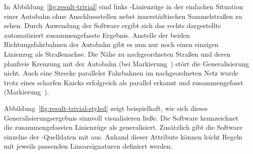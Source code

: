 \documentclass[../main/thesis.tex]{subfiles}
\begin{document}
In Abbildung~\ref{fig:result-trivial} sind links \osm-Linienzüge in der einfachen Situation einer Autobahn ohne Anschlussstellen nebst innerstädtischen Sammelstraßen zu sehen.
Durch Anwendung der Software ergibt sich das rechts dargestellte automatisiert zusammengefasste Ergebnis.
Anstelle der beiden Richtungsfahrbahnen der Autobahn gibt es nun nur noch einen einzigen Linienzug als Straßenachse.
Die Nähe zu nachgeordneten Straßen und deren planfreie Kreuzung mit der Autobahn (bei Markierung~) stört die Generalisierung nicht.
Auch eine Strecke paralleler Fahrbahnen im nachgeordneten Netz wurde trotz eines scharfen Knicks erfolgreich als parallel erkannt und zusammengefasst (Markierung~).

Abbildung~\ref{fig:result-trivial-styled} zeigt beispielhaft, wie sich dieses Generalisierungsergebnis sinnvoll visualisieren ließe.
Die Software kennzeichnet die zusammengefassten Linienzüge als generalisiert.
Zusätzlich gibt die Software einzelne  der \osm-Quelldaten mit aus.
Anhand dieser Attribute können leicht Regeln mit jeweils passenden Linearsignaturen definiert werden.

\end{document}
